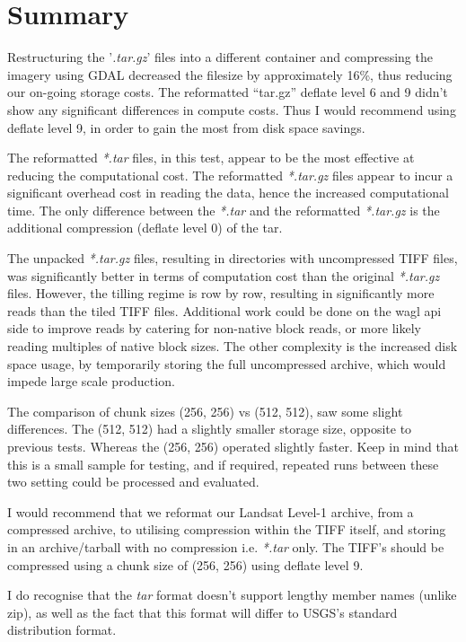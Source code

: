 \documentclass[a4paper]{article}
\begin{document}
  \clearpage
  \section{Summary}
    \begin{flushleft}
    Restructuring the '\textit{.tar.gz}' files into a different container and compressing the imagery using GDAL decreased the filesize by approximately 16\%, thus reducing our on-going storage costs.
    The reformatted “tar.gz” deflate level 6 and 9 didn’t show any significant differences in compute costs. Thus I would recommend using deflate level 9, in order to gain the most from disk space savings.
    
    The reformatted \textit{*.tar} files, in this test, appear to be the most effective at reducing the computational cost. The reformatted \textit{*.tar.gz} files appear to incur a significant overhead cost in reading the data, hence the increased computational time. The only difference between the \textit{*.tar} and the reformatted \textit{*.tar.gz} is the additional compression (deflate level 0) of the tar. \par
    The unpacked \textit{*.tar.gz} files, resulting in directories with uncompressed TIFF files, was significantly better in terms of computation cost than the original \textit{*.tar.gz} files. However, the tilling regime is row by row, resulting in significantly more reads than the tiled TIFF files. Additional work could be done on the wagl api side to improve reads by catering for non-native block reads, or more likely reading multiples of native block sizes. The other complexity is the increased disk space usage, by temporarily storing the full uncompressed archive, which would impede large scale production. \par
    The comparison of chunk sizes (256, 256) vs (512, 512), saw some slight differences. The (512, 512) had a slightly smaller storage size, opposite to previous tests. Whereas the (256, 256) operated slightly faster. Keep in mind that this is a small sample for testing, and if required, repeated runs between these two setting could be processed and evaluated. \par
    I would recommend that we reformat our Landsat Level-1 archive, from a compressed archive, to utilising compression within the TIFF itself, and storing in an archive/tarball with no compression i.e.  \textit{*.tar} only. The TIFF’s should be compressed using a chunk size of (256, 256) using deflate level 9. \par
    I do recognise that the \textit{tar} format doesn’t support lengthy member names (unlike zip), as well as the fact that this format will differ to USGS’s standard distribution format. \par

\end{flushleft}
\end{document}

